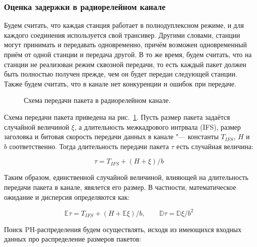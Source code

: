 \subsubsection{Оценка задержки в радиорелейном канале}

Будем считать, что каждая станция работает в полнодуплексном режиме, и для каждого соединения используется свой трансивер. Другими словами, станции могут принимать и передавать одновременно, причём возможен одновременный приём от одной станции и передача другой. В то же время, будем считать, что на станции не реализован режим сквозной передачи, то есть каждый пакет должен быть полностью получен прежде, чем он будет передан следующей станции. Также будем считать, что в канале нет конкуренции и ошибок при передаче.

\begin{figure}[h]
  \caption{Схема передачи пакета в радиорелейном канале.}
  \label{fig:ch4_relay_channel}
\end{figure}

Схема передачи пакета приведена на рис.~\ref{fig:ch4_relay_channel}. Пусть размер пакета задаётся случайной величиной $\xi$, а длительность межкадрового интрвала (IFS), размер заголовка и битовая скорость передачи данных в канале "--- константы $T_{IFS}$, $H$ и $b$ соответственно. Тогда длительность передачи пакета $\tau$ есть случайная величина:

\begin{equation}
  \label{eq:ch4_relay_channel_delay}
  \tau = T_{IFS} + (H + \xi) / b
\end{equation}

Таким образом, единственной случайной величиной, влияющей на длительность передачи пакета в канале, явялется его размер. В частности, математическое ожидание и дисперсия определяются как:

\begin{equation}
  \label{eq:ch4_relay_channel_moments}
  \mathbb{E}\tau = T_{IFS} + (H + \mathbb{E}\xi)/b,\qquad
  \mathbb{D}\tau = \mathbb{D}\xi / b^2
\end{equation}

Поиск PH-распределения будем осуществлять, исходя из имеющихся входных данных про распределение размеров пакетов:

